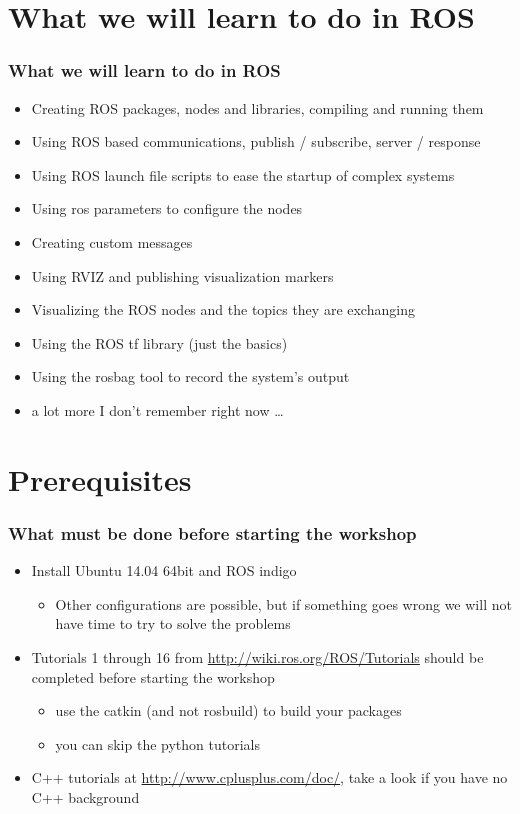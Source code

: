 \documentclass[]{beamer}
\begin{document}
\section{What we will learn to do in ROS} 
\begin{frame}\frametitle{What we will learn to do in ROS} 
\begin{itemize}
\item Creating ROS packages, nodes and libraries, compiling and running them
\item Using ROS based communications, publish / subscribe, server / response
\item Using ROS launch file scripts to ease the startup of complex systems
\item Using ros parameters to configure the nodes
\item Creating custom messages
\item Using RVIZ and publishing visualization markers
\item Visualizing the ROS nodes and the topics they are exchanging
\item Using the ROS tf library (just the basics)
\item Using the rosbag tool to record the system's output
\item a lot more I don't remember right now \ldots
\end{itemize}
\end{frame}

\section{Prerequisites} 
\begin{frame}\frametitle{What must be done before starting the workshop}
\begin{itemize}
\item Install Ubuntu 14.04 64bit and ROS indigo 
\begin{itemize}
\item Other configurations are possible, but if something goes wrong we will not
have time to try to solve the problems
\end{itemize}
\item Tutorials 1 through 16 from \url{http://wiki.ros.org/ROS/Tutorials} should
be completed before starting the workshop
\begin{itemize}
\item use the catkin (and not rosbuild) to build your packages
\item you can skip the python tutorials
\end{itemize}
\item C++ tutorials at \url{http://www.cplusplus.com/doc/}, take a look if you
have no C++ background
\end{itemize}
\end{frame}
\end{document}
